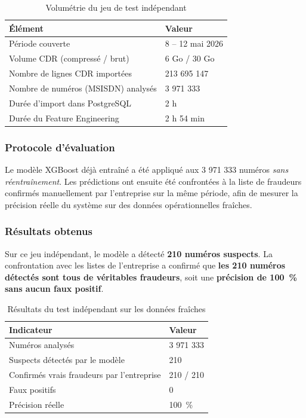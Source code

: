 \documentclass[12pt, oneside, a4paper]{report}
\begin{document}
\begin{table}[H]
\centering
\caption{Volumétrie du jeu de test indépendant}
\label{tab:fresh-volume}
\vspace{0.3cm}
\renewcommand{\arraystretch}{1.3}
\begin{tabular}{|l|l|}
\hline
\textbf{Élément} & \textbf{Valeur} \\
\hline
Période couverte & 8 -- 12 mai 2026 \\
\hline
Volume CDR (compressé / brut) & 6 Go / 30 Go \\
\hline
Nombre de lignes CDR importées & 213 695 147 \\
\hline
Nombre de numéros (MSISDN) analysés & 3 971 333 \\
\hline
Durée d'import dans PostgreSQL & 2 h  \\
\hline
Durée du Feature Engineering & 2 h 54 min \\
\hline
\end{tabular}
\end{table}



\subsubsection{Protocole d'évaluation}
Le modèle XGBoost déjà entraîné a été appliqué aux 3 971 333 numéros
\emph{sans réentraînement}. Les prédictions ont ensuite été confrontées
à la liste de fraudeurs confirmés manuellement par l'entreprise sur la
même période, afin de mesurer la précision réelle du système sur des
données opérationnelles fraîches.

\subsubsection{Résultats obtenus}

Sur ce jeu indépendant, le modèle a détecté \textbf{210 numéros
suspects}. La confrontation avec les listes de l'entreprise a confirmé
que \textbf{les 210 numéros détectés sont tous de véritables
fraudeurs}, soit une \textbf{précision de 100~\% sans aucun faux
positif}.

\begin{table}[H]
\centering
\caption{Résultats du test indépendant sur les données fraîches}
\label{tab:fresh-resultats}
\vspace{0.3cm}
\renewcommand{\arraystretch}{1.3}
\begin{tabular}{|l|l|}
\hline
\textbf{Indicateur} & \textbf{Valeur} \\
\hline
Numéros analysés & 3 971 333 \\
\hline
Suspects détectés par le modèle & 210 \\
\hline
Confirmés vrais fraudeurs par l'entreprise & 210 / 210 \\
\hline
Faux positifs & 0 \\
\hline
Précision réelle & 100~\% \\
\hline
\end{tabular}
\end{table}
\end{document}
